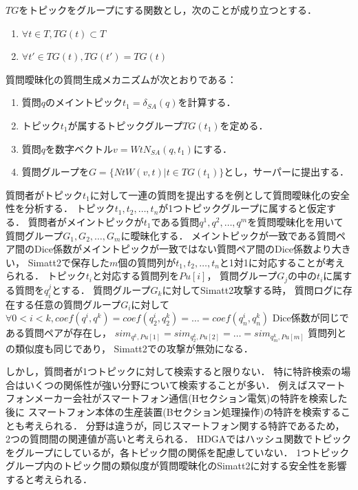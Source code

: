 \documentclass[master]{suribt}
\theoremstyle{definition}
\begin{document}
 $TG$をトピックをグループにする関数とし，次のことが成り立つとする．
 \begin{enumerate}
 \renewcommand{\labelenumi}{(\roman{enumi})}
 \item $\forall t \in T,TG(t) \subset T$ 
 \item $\forall t' \in TG(t),TG(t') = TG(t)$
 \end{enumerate}
 
 質問曖昧化の質問生成メカニズムが次とおりである：
 \begin{enumerate}
 \renewcommand{\labelenumi}{(\roman{enumi})}
 \item 質問$q$のメイントピック$t_1 = \delta_{SA}(q)$を計算する． 
 \item トピック$t_1$が属するトピックグループ$TG(t_1)$を定める．
 \item 質問$q$を数字ベクトル$v = WtN_{SA}(q,t_1)$にする．
 \item 質問グループを$G = \{NtW(v,t)|t \in TG(t_1)\}$とし，サーパーに提出する．
 \end{enumerate}

 質問者がトピック$t_1$に対して一連の質問を提出するを例として質問曖昧化の安全性を分析する．
 トピック$t_1,t_2, \dots ,t_n$が1つトピックグループに属すると仮定する．
 質問者がメイントピックが$t_1$である質問$q^1,q^2, \dots , q^m$を質問曖昧化を用いて質問グループ$G_1,G_2, \dots , G_m$に曖昧化する．
 メイントピックが一致である質問ペア間のDice係数がメイントピックが一致ではない質問ペア間のDice係数より大きい，
 Simatt2で保存した$m$個の質問列が$t_1,t_2, \dots ,t_n$と1対1に対応することが考えられる．
 トピック$t_i$と対応する質問列を$Pu[i]$，
 質問グループ$G_j$の中の$t_i$に属する質問を$q^j_i$とする．
 質問グループ$G_k$に対してSimatt2攻撃する時，
 質問ログに存在する任意の質問グループ$G_i$に対して
 $\forall 0 < i < k, coef(q^i,q^k) = coef(q^i_2,q^k_2) = \dots = coef(q^i_n,q^k_n)$
 Dice係数が同じである質問ペアが存在し，
 $sim_{q^k,Pu[1]} = sim_{q^k_2,Pu[2]} = \dots = sim_{q^k_m,Pu[m]}$
 質問列との類似度も同じであり，
 Simatt2での攻撃が無効になる．

 しかし，質問者が1つトピックに対して検索すると限りない．
 特に特許検索の場合はいくつの関係性が強い分野について検索することが多い．
 例えばスマートフォンメーカー会社がスマートフォン通信(Hセクション電気)の特許を検索した後に
 スマートフォン本体の生産装置(Bセクション処理操作)の特許を検索することも考えられる． 
 分野は違うが，同じスマートフォン関する特許であるため，
 2つの質問間の関連値が高いと考えられる．
 HDGAではハッシュ関数でトピックをグループにしているが，各トピック間の関係を配慮していない．
 1つトピックグループ内のトピック間の類似度が質問曖昧化のSimatt2に対する安全性を影響すると考えられる．
\end{document}
